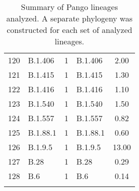 \begin{longtable}{llcp{4cm}c}
  120 & B.1.406 &   1 & B.1.406 & 2.00 \\ 
  121 & B.1.415 &   1 & B.1.415 & 1.30 \\ 
  122 & B.1.416 &   1 & B.1.416 & 1.10 \\ 
  123 & B.1.540 &   1 & B.1.540 & 1.50 \\ 
  124 & B.1.557 &   1 & B.1.557 & 0.82 \\ 
  125 & B.1.88.1 &   1 & B.1.88.1 & 0.60 \\ 
  126 & B.1.9.5 &   1 & B.1.9.5 & 13.00 \\ 
  127 & B.28 &   1 & B.28 & 0.29 \\ 
  128 & B.6 &   1 & B.6 & 0.14 \\ 
   \hline
\hline
\caption{Summary of Pango lineages analyzed. A separate phylogeny was constructed for each set of analyzed lineages.} 
\label{tab:lineage-data-summary}
\end{longtable}
